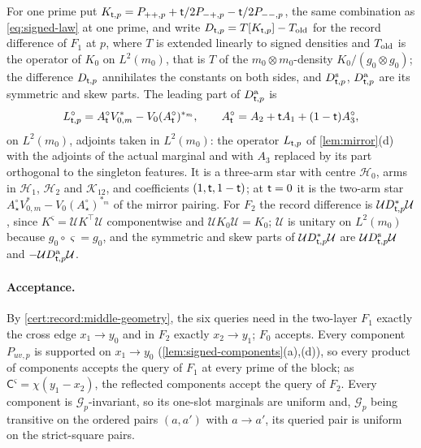 For one prime put
$K_{\mathsf t,p}=P_{++,p}+\mathsf t/2P_{-+,p}-\mathsf t/2P_{--,p}$,
the same combination as \eqref{eq:signed-law} at one prime, and
write $D_{\mathsf t,p}=T[K_{\mathsf t,p}]-T_{\rm old}$ for the record
difference of $F_1$ at $p$, where $T$ is extended linearly to signed densities
and $T_{\rm old}$ is the operator of $K_0$ on $L^2(m_0)$, that is $T$ of the
$m_0\otimes m_0$-density $K_0/(g_0\otimes g_0)$; the difference $D_{\mathsf t,p}$ annihilates
the constants on both sides, and $D^{\rm s}_{\mathsf t,p}$, $D^{\rm a}_{\mathsf t,p}$ are its
symmetric and skew parts. The leading part of $D^{\rm a}_{\mathsf t,p}$ is
\begin{equation}\label{eq:signed-leading}
 L^\circ_{\mathsf t,p}=A^\circ_\mathsf t V_{0,m}^*-V_0(A^\circ_\mathsf t)^{*_m},\qquad
 A^\circ_\mathsf t=A_2+\mathsf t A_1+(1-\mathsf t)A_3^\circ,
\end{equation}
on $L^2(m_0)$, adjoints taken in $L^2(m_0)$: the operator $L_{\mathsf t,p}$ of
\cref{lem:mirror}(d) with the adjoints of the actual marginal and with $A_3$
replaced by its part orthogonal to the singleton features. It is a three-arm
star with centre $\mathcal H_0$, arms in $\mathcal H_1$, $\mathcal H_2$ and
$\mathcal K_{12}$, and coefficients $(1,\mathsf t,1-\mathsf t)$; at $\mathsf t=0$ it is the
two-arm star $A^\circ_\star V^*_{0,m}-V_0(A^\circ_\star)^{*_m}$ of the mirror pairing.
For $F_2$ the record difference is $\mathcal UD_{\mathsf t,p}^*\mathcal U$, since
$K^\varsigma=\mathcal UK^\top\mathcal U$ componentwise and $\mathcal UK_0\mathcal U=K_0$;
$\mathcal U$ is unitary on $L^2(m_0)$ because $g_0\circ\varsigma=g_0$, and the
symmetric and skew parts of $\mathcal UD_{\mathsf t,p}^*\mathcal U$ are
$\mathcal UD^{\rm s}_{\mathsf t,p}\mathcal U$ and $-\mathcal UD^{\rm a}_{\mathsf t,p}\mathcal U$.

\paragraph{Acceptance.}
By \cref{cert:record:middle-geometry}, the six queries need in the two-layer
$F_1$ exactly the cross edge $x_1\to y_0$ and in $F_2$ exactly $x_2\to y_1$;
$F_0$ accepts. Every component $P_{uv,p}$ is supported on $x_1\to y_0$
(\cref{lem:signed-components}(a),(d)), so every product of components accepts
the query of $F_1$ at every prime of the block; as
$\mathsf C^\varsigma=\chi(y_1-x_2)$, the reflected components accept the query of
$F_2$. Every component is $\mathcal G_p$-invariant, so its one-slot marginals are
uniform and, $\mathcal G_p$ being transitive on the ordered pairs $(a,a')$ with
$a\to a'$, its queried pair is uniform on the strict-square pairs.

